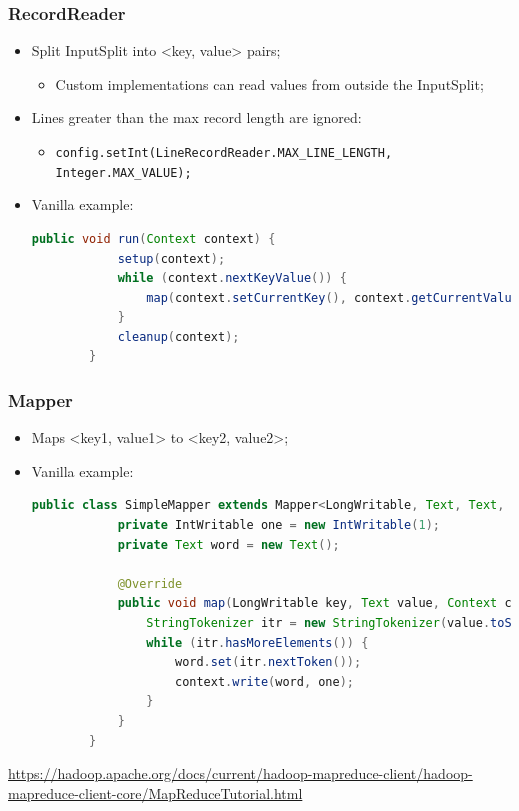 \documentclass[aspectratio=169]{beamer}
\begin{document}
\begin{frame}[fragile]
	\frametitle{RecordReader}

	\begin{itemize}
		\item Split InputSplit into <key, value> pairs;
		      \begin{itemize}
			      \item Custom implementations can read values from outside the InputSplit;
		      \end{itemize}
		\item Lines greater than the max record length are ignored:
		      \begin{itemize}
			      \item {\scriptsize \texttt{config.setInt(LineRecordReader.MAX\_LINE\_LENGTH, Integer.MAX\_VALUE);}}
		      \end{itemize}
		\item Vanilla example:
		      \begin{lstlisting}[language=java,basicstyle=\tiny,columns=fullflexible]
        public void run(Context context) {
            setup(context);
            while (context.nextKeyValue()) {
                map(context.setCurrentKey(), context.getCurrentValue(), context);
            }
            cleanup(context);
        }
            \end{lstlisting}
	\end{itemize}
\end{frame}

\begin{frame}[fragile]
	\frametitle{Mapper}

	\begin{itemize}
		\item Maps <key1, value1> to <key2, value2>;
		\item Vanilla example:
		      \begin{lstlisting}[language=java,basicstyle=\tiny,columns=fullflexible]
        public class SimpleMapper extends Mapper<LongWritable, Text, Text, IntWritable> {
            private IntWritable one = new IntWritable(1);
            private Text word = new Text();

            @Override
            public void map(LongWritable key, Text value, Context context) {
                StringTokenizer itr = new StringTokenizer(value.toString());
                while (itr.hasMoreElements()) {
                    word.set(itr.nextToken());
                    context.write(word, one);
                }
            }
        }
            \end{lstlisting}
	\end{itemize}

	\begin{center}
		{\tiny \href{https://hadoop.apache.org/docs/current/hadoop-mapreduce-client/hadoop-mapreduce-client-core/MapReduceTutorial.html}{https://hadoop.apache.org/docs/current/hadoop-mapreduce-client/hadoop-mapreduce-client-core/MapReduceTutorial.html}}
	\end{center}
\end{frame}
\end{document}
